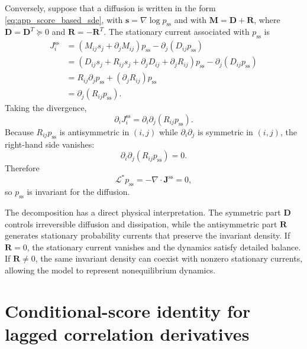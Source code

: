 \documentclass[11pt,twoside,fleqn]{article}
\begin{document}
Conversely, suppose that a diffusion is written in the form
\eqref{eq:app_score_based_sde}, with $\bm{s}=\nabla\log p_{\mathrm{ss}}$ and with
$\bm{M}=\bm{D}+\bm{R}$, where $\bm{D}=\bm{D}^T\succeq 0$ and
$\bm{R}=-\bm{R}^T$. The stationary current associated with $p_{\mathrm{ss}}$ is
\begin{align}
    J_i^{\mathrm{ss}}
    &=
    \left(
        M_{ij}s_j+\partial_jM_{ij}
    \right)p_{\mathrm{ss}}
    -
    \partial_j(D_{ij}p_{\mathrm{ss}})
    \nonumber\\
    &=
    \left(
        D_{ij}s_j+R_{ij}s_j+\partial_jD_{ij}+\partial_jR_{ij}
    \right)p_{\mathrm{ss}}
    -
    \partial_j(D_{ij}p_{\mathrm{ss}})
    \nonumber\\
    &=
    R_{ij}\partial_j p_{\mathrm{ss}}
    +
    (\partial_jR_{ij})p_{\mathrm{ss}}
    \nonumber\\
    &=
    \partial_j(R_{ij}p_{\mathrm{ss}}).
    \label{eq:app_converse_current}
\end{align}
Taking the divergence,
\begin{equation}
    \partial_iJ_i^{\mathrm{ss}}
    =
    \partial_i\partial_j(R_{ij}p_{\mathrm{ss}}).
    \label{eq:app_converse_divergence}
\end{equation}
Because $R_{ij}p_{\mathrm{ss}}$ is antisymmetric in $(i,j)$ while
$\partial_i\partial_j$ is symmetric in $(i,j)$, the right-hand side vanishes:
\begin{equation}
    \partial_i\partial_j(R_{ij}p_{\mathrm{ss}})
    =
    0.
    \label{eq:app_antisymmetry_cancellation}
\end{equation}
Therefore
\begin{equation}
    \mathcal{L}^*p_{\mathrm{ss}}
    =
    -\nabla\cdot\bm{J}^{\mathrm{ss}}
    =
    0,
    \label{eq:app_stationarity_verified}
\end{equation}
so $p_{\mathrm{ss}}$ is invariant for the diffusion.

The decomposition has a direct physical interpretation. The symmetric part $\bm{D}$ controls irreversible diffusion and dissipation, while the antisymmetric part $\bm{R}$ generates stationary probability currents that preserve the invariant density. If $\bm{R}=0$, the stationary current vanishes and the dynamics satisfy detailed balance. If $\bm{R}\neq 0$, the same invariant density can coexist with nonzero stationary currents, allowing the model to represent nonequilibrium dynamics.

\section{Conditional-score identity for lagged correlation derivatives}
\label{app:conditional_score_correlation_identity}
\end{document}
